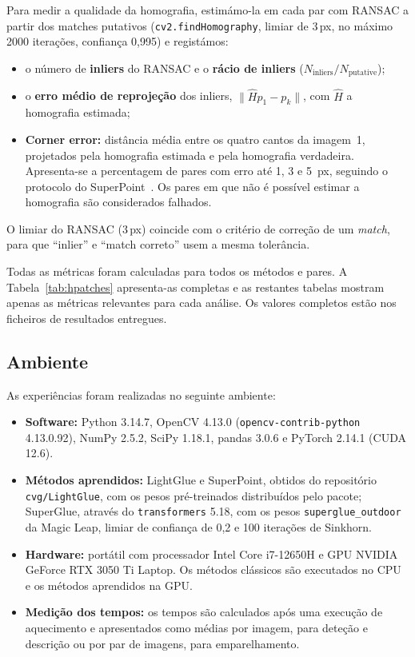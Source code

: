 \documentclass[11pt,a4paper]{article}
\newcommand{\px}{\,px}
\begin{document}
Para medir a qualidade da homografia, estimámo-la em cada par com RANSAC a partir dos matches putativos
(\texttt{cv2.findHomography}, limiar de 3\px, no máximo 2000 iterações, confiança 0,995) e
registámos:
\begin{itemize}
  \item o número de \textbf{inliers} do RANSAC e o \textbf{rácio de inliers} ($N_\text{inliers}/N_\text{putative}$);
  \item o \textbf{erro médio de reprojeção} dos inliers, $\lVert \hat H p_1 - p_k\rVert$, com $\hat H$ a
  homografia estimada; 
   \item \textbf{Corner error:} distância média entre os quatro cantos da imagem~1, projetados pela homografia estimada e pela homografia verdadeira. Apresenta-se a percentagem de pares com erro até 1, 3 e 5~px, seguindo o protocolo do SuperPoint~\cite{detone2018}. Os pares em que não é possível estimar a homografia são considerados falhados. 
\end{itemize}
O limiar do RANSAC (3\px) coincide com o critério de correção de um \textit{match}, para que ``inlier'' e ``match
correto'' usem a mesma tolerância.

Todas as métricas foram calculadas para todos os métodos e pares. A Tabela~\ref{tab:hpatches} apresenta-as completas e as restantes tabelas mostram apenas as métricas relevantes para cada
análise. Os valores completos estão nos ficheiros de resultados entregues.

\subsection{Ambiente}

As experiências foram realizadas no seguinte ambiente:

\begin{itemize} \item \textbf{Software:} Python 3.14.7, OpenCV 4.13.0 (\texttt{opencv-contrib-python} 4.13.0.92), NumPy 2.5.2, SciPy 1.18.1, pandas 3.0.6 e PyTorch 2.14.1 (CUDA 12.6).

\item \textbf{Métodos aprendidos:} LightGlue e SuperPoint, obtidos do repositório \texttt{cvg/LightGlue}, com os pesos pré-treinados distribuídos pelo pacote; SuperGlue, através do \texttt{transformers} 5.18, com os pesos \texttt{superglue\_outdoor} da Magic Leap, limiar de confiança de 0,2 e 100 iterações de Sinkhorn.

\item \textbf{Hardware:} portátil com processador Intel Core i7-12650H e GPU NVIDIA GeForce RTX 3050 Ti Laptop. Os métodos clássicos são executados no CPU e os métodos aprendidos na GPU.

\item \textbf{Medição dos tempos:} os tempos são calculados após uma execução de aquecimento e apresentados como médias por imagem, para deteção e descrição ou por par de imagens, para emparelhamento.

\end{itemize}
\end{document}
